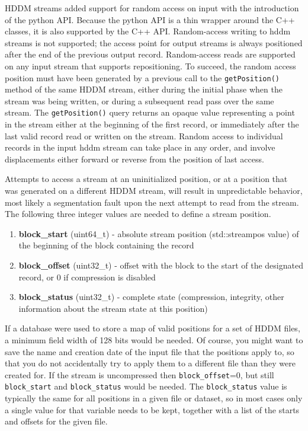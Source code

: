 \documentclass{revtex4}
\begin{document}
HDDM streams added support for random access on input with the introduction
of the python API. Because the python API is a thin wrapper around the C++
classes, it is also supported by the C++ API. Random-{}access writing to hddm
streams is not supported; the access point for output streams is always
positioned after the end of the previous output record. Random-access reads
are supported on any input stream that supports repositioning. To succeed,
the random access position must have been generated by a previous call to
the \texttt{getPosition()} method of the same HDDM stream, either during the
initial phase when the stream was being written, or during a subsequent read
pass over the same stream. The \texttt{getPosition()} query returns an opaque
value representing a point in the stream either at the beginning of the first
record, or immediately after the last valid record read or written on the 
stream. Random access to individual records in the input hddm stream can
take place in any order, and involve displacements either forward or reverse
from the position of last access. 

Attempts to access a stream at an uninitialized position, or at a position
that was generated on a different HDDM stream, will result in unpredictable
behavior, most likely a segmentation fault upon the next attempt to read
from the stream. The following three integer values are needed to define
a stream position.

\begin{enumerate}
\item {\bfseries block\_start} (uint64\_t) -{} absolute stream position 
(std::streampos value) of the beginning of the block containing the record
\item {\bfseries block\_offset} (uint32\_t) -{} offset with the block to
the start of the designated record, or 0 if compression is disabled
\item {\bfseries block\_status} (uint32\_t) -{} complete state (compression,
integrity, other information about the stream state at this position)
\end{enumerate}

If a database were used to store a map of valid positions for a set of HDDM
files, a minimum field width of 128 bits would be needed. Of course, you might
want to save the name and creation date of the input file that the positions
apply to, so that you do not accidentally try to apply them to a different
file than they were created for. If the stream is uncompressed then 
\texttt{block\_offset}=0, but still \texttt{block\_start} and 
\texttt{block\_status} would be needed. The \texttt{block\_status} value is
typically the same for all positions in a given file or dataset, so in most
cases only a single value for that variable needs to be kept, together with
a list of the starts and offsets for the given file.
\end{document}
